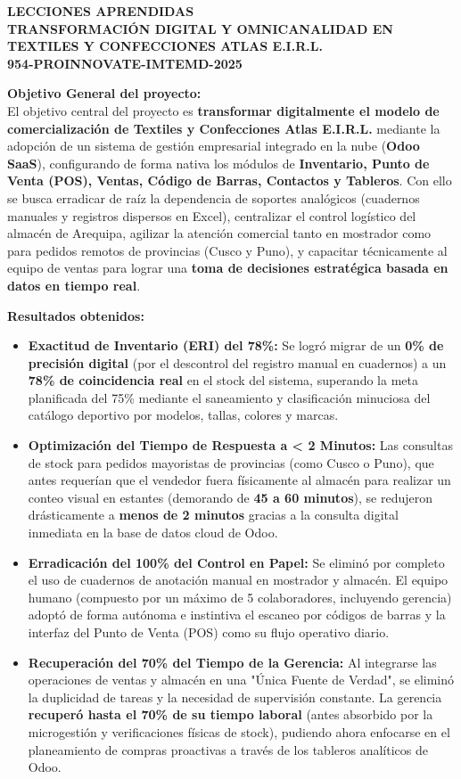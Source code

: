 \documentclass[11pt]{article}
\begin{document}
\begin{center}
    {\Large \textbf{LECCIONES APRENDIDAS}}\\[0.25cm]
    {\Large \textbf{TRANSFORMACIÓN DIGITAL Y OMNICANALIDAD EN TEXTILES Y CONFECCIONES ATLAS E.I.R.L.}}\\[0.25cm]
    {\large \textbf{954-PROINNOVATE-IMTEMD-2025}}
\end{center}

\textbf{Objetivo General del proyecto:}\\
El objetivo central del proyecto es \textbf{transformar digitalmente el modelo de comercialización de Textiles y Confecciones Atlas E.I.R.L.} mediante la adopción de un sistema de gestión empresarial integrado en la nube (\textbf{Odoo SaaS}), configurando de forma nativa los módulos de \textbf{Inventario, Punto de Venta (POS), Ventas, Código de Barras, Contactos y Tableros}. Con ello se busca erradicar de raíz la dependencia de soportes analógicos (cuadernos manuales y registros dispersos en Excel), centralizar el control logístico del almacén de Arequipa, agilizar la atención comercial tanto en mostrador como para pedidos remotos de provincias (Cusco y Puno), y capacitar técnicamente al equipo de ventas para lograr una \textbf{toma de decisiones estratégica basada en datos en tiempo real}.

\textbf{Resultados obtenidos:}
\begin{itemize}
    \item \textbf{Exactitud de Inventario (ERI) del 78\%:} Se logró migrar de un \textbf{0\% de precisión digital} (por el descontrol del registro manual en cuadernos) a un \textbf{78\% de coincidencia real} en el stock del sistema, superando la meta planificada del 75\% mediante el saneamiento y clasificación minuciosa del catálogo deportivo por modelos, tallas, colores y marcas.
    \item \textbf{Optimización del Tiempo de Respuesta a < 2 Minutos:} Las consultas de stock para pedidos mayoristas de provincias (como Cusco o Puno), que antes requerían que el vendedor fuera físicamente al almacén para realizar un conteo visual en estantes (demorando de \textbf{45 a 60 minutos}), se redujeron drásticamente a \textbf{menos de 2 minutos} gracias a la consulta digital inmediata en la base de datos cloud de Odoo.
    \item \textbf{Erradicación del 100\% del Control en Papel:} Se eliminó por completo el uso de cuadernos de anotación manual en mostrador y almacén. El equipo humano (compuesto por un máximo de 5 colaboradores, incluyendo gerencia) adoptó de forma autónoma e instintiva el escaneo por códigos de barras y la interfaz del Punto de Venta (POS) como su flujo operativo diario.
    \item \textbf{Recuperación del 70\% del Tiempo de la Gerencia:} Al integrarse las operaciones de ventas y almacén en una "Única Fuente de Verdad", se eliminó la duplicidad de tareas y la necesidad de supervisión constante. La gerencia \textbf{recuperó hasta el 70\% de su tiempo laboral} (antes absorbido por la microgestión y verificaciones físicas de stock), pudiendo ahora enfocarse en el planeamiento de compras proactivas a través de los tableros analíticos de Odoo.
\end{itemize}
\end{document}
